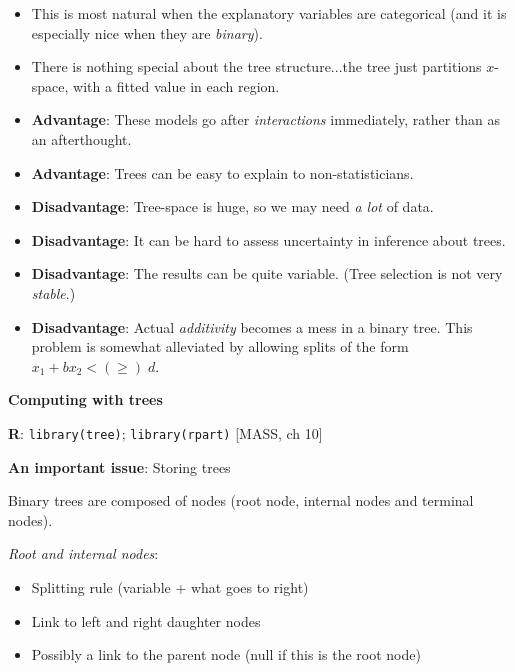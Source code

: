 \begin{itemize}

\item This is most natural when the explanatory variables are
  categorical (and it is especially nice when they are \emph{binary}).

\item There is nothing special about the tree structure...the tree
  just partitions $x$-space, with a fitted value in each region.

\item \textbf{Advantage}: These models go after
  \emph{interactions\/} immediately, rather than as an afterthought.  

\item \textbf{Advantage}: Trees can be easy to explain to
  non-statisticians. 
  
\item \textbf{Disadvantage}: Tree-space is huge, so we may need
  \emph{a lot\/} of data.
  
\item \textbf{Disadvantage}: It can be hard to assess uncertainty in
  inference about trees.

\item \textbf{Disadvantage}: The results can be quite variable.  (Tree
  selection is not very \emph{stable}.)

\item \textbf{Disadvantage}: Actual \emph{additivity\/} becomes a mess
  in a binary tree.  This problem is somewhat alleviated by allowing
  splits of the form $x_1 + b x_2 < (\ge) \; d$.

\end{itemize}





\centerline{\textbf{Computing with trees}}




\textbf{R}: \verb|library(tree)|; \verb|library(rpart)|  
[MASS, ch 10]


\textbf{An important issue}: Storing trees


Binary trees are composed of nodes (root node, internal nodes and
terminal nodes).


\emph{Root and internal nodes}:
\begin{itemize}
\item Splitting rule (variable + what goes to right)
\item Link to left and right daughter nodes
\item Possibly a link to the parent node (null if this is the root
  node)
\end{itemize}

